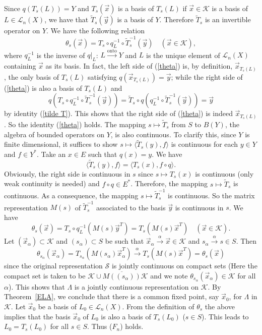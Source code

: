 \documentclass{tran-l}
\numberwithin{equation}{section}
\theoremstyle{definition}
\theoremstyle{remark}
\begin{document}
Since $q(T_s(L)) = Y$ and $T_s(\vec x)$ is a basis of $T_s(L)$ if $\vec x\in {\mathcal{K}}$ is a basis of $L\in {\mathcal{L}}_n(X)$, we have that $\tilde T_s(\vec y)$ is a basis of $Y$. Therefore $\tilde T_s$ is an invertible operator on $Y$. We have the following relation
\begin{equation}\label{theta}
\theta_s(\vec x) = T_s\circ q_L^{-1}\circ \tilde T_s^{-1} (\vec y) \quad (\vec x\in {\mathcal{K}}),
\end{equation}
where $q_L^{-1}$ is the inverse of $q|_L$: $L \stackrel{\text{onto}}{\longrightarrow} Y$ and $L$ is the unique element of ${\mathcal{L}}_n(X)$ containing $\vec x$ as its basis. In fact, the left side of (\ref{theta}) is, by definition, $\vec x_{T_s(L)}$, the only basis of $T_s(L)$ satisfying $q(\vec x_{T_s(L)}) = \vec y$; while the right side of (\ref{theta}) is also a basis of $T_s(L)$ and
\[
q\left(T_s\circ q_L^{-1}\circ \tilde T_s^{-1} (\vec y)\right) = \tilde T_s\circ q\left( q_L^{-1}\circ \tilde T_s^{-1} (\vec y)\right)= \vec y
\]
by identity (\ref{tilde T}).
This shows that the right side of (\ref{theta}) is indeed $\vec x_{T_s(L)}$. So the identity (\ref{theta}) holds.
The mapping $s\mapsto \tilde T_s$ from $S$ to $B(Y)$, the algebra of bounded operators on $Y$, is also continuous. To clarify this, since $Y$ is finite dimensional, it suffices to show $s\mapsto {\langle} \tilde T_s(y),f{\rangle}$ is continuous for each $y\in Y$ and $f\in Y^*$. Take an $x\in E$ such that $q(x) = y$. We have
\[
 {\langle} \tilde T_s(y),f{\rangle} = {\langle} T_s(x),f\circ q{\rangle}.
\]
Obviously, the right side is continuous in $s$ since $s\mapsto T_s(x)$ is continuous (only weak continuity is needed) and $f\circ q\in E^*$. Therefore, the mapping $s\mapsto \tilde T_s$ is continuous. As a consequence, the mapping $s\mapsto \tilde T_s^{-1}$ is continuous. So the matrix representation $M(s)$ of $\tilde T_s^{-1}$ associated to the basis $\vec y$ is continuous in $s$. We have
\[
\theta_s(\vec x) = T_s\circ q_L^{-1} \left(M(s) \vec y^T\right) =T_s( M(s)\vec x^T)  \quad (\vec x\in {\mathcal{K}}).
\]
Let $(\vec x_{\alpha})\subset {\mathcal{K}}$ and $(s_{\alpha})\subset S$ be such that $\vec x_{\alpha} \overset{\alpha}{\to} \vec x\in {\mathcal{K}}$ and $s_{\alpha} \overset{\alpha}{\to}s \in S$. Then 
\[
\theta_{s_{\alpha}}(\vec x_{\alpha}) = T_{s_{\alpha}}( M(s_{\alpha})\vec x_{\alpha}^T) \overset{\alpha}{\to} T_s( M(s)\vec x^T) = \theta_s(\vec x)
\]
since the original representation ${\mathcal{S}}$ is jointly continuous on compact sets (Here the compact set is taken to be ${\mathcal{K}}\cup \overline{M((s_{\alpha}))}{\mathcal{K}}$ and we note $\theta_{s_{\alpha}}(\vec x_{\alpha})\in {\mathcal{K}}$ for all ${\alpha}$). This shows that $\Lambda$ is a jointly continuous representation on ${\mathcal{K}}$. By Theorem~\ref{ELA}, we conclude that there is a common fixed point, say $\vec x_0$, for $\Lambda$ in ${\mathcal{K}}$. Let $\vec x_0$ be a basis of $L_0\in {\mathcal{L}}_n(X)$. From the definition of $\theta_s$ the above implies that the basis $\vec x_0$ of $L_0$ is also a basis of $T_s(L_0)$ ($s\in S$). This leads to $L_0 = T_s(L_0)$ for all $s\in S$. Thus ($F_n$) holds.
\end{document}

